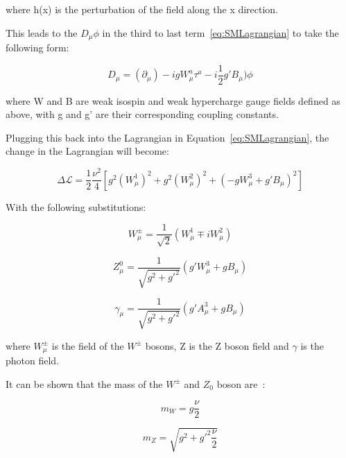 where h(x) is the perturbation of the field along the x direction.

This leads to the $D_{\mu} \phi$ in the third to last term~\ref{eq:SMLagrangian} to take the following form:

\begin{equation}
    D_{\mu} = (\partial_{\mu}) - ig W_{\mu}^{a}\tau^{a} - i\frac{1}{2}g'B_{\mu}) \phi
\end{equation}

where W and B are weak isospin and weak hypercharge gauge fields defined as above, with g and g' are their corresponding coupling constants. %

Plugging this back into the Lagrangian in Equation~\ref{eq:SMLagrangian}, the change in the Lagrangian will become:

\begin{equation}
    \Delta \mathcal{L} = \frac{1}{2} \frac{\nu^{2}}{4}[g^{2}(W^{1}_{\mu})^2 + g^{2}(W_{\mu}^{2})^{2} + (-g W_{\mu}^{3}+ g'B_{\mu})^2]
\end{equation}

With the following substitutions:

\begin{equation}
    W^{\pm}_{\mu} = \frac{1}{\sqrt{2}}(W_{\mu}^{1} \mp iW^{2}_{\mu}) 
\end{equation}

\begin{equation}
    Z^{0}_{\mu}=\frac{1}{\sqrt{g^{2}+g'^{2}}}(g'W_{\mu}^{3} + gB_{\mu})
\end{equation}

\begin{equation}
    \gamma_{\mu} = \frac{1}{\sqrt{g^{2}+g'^{2}}}(g'A^{3}_{\mu} + g B_{\mu})
\end{equation}

where $W^{\pm}_{\mu}$ is the field of the $W^{\pm}$ bosons, Z is the Z boson field and $\gamma$ is the photon field. 

It can be shown that the mass of the $W^{\pm}$ and $Z_{0}$ boson are~\cite{peskin2018introduction}:

\begin{equation}
    m_{W} = g \frac{\nu}{2}
\end{equation}

\begin{equation}
    m_{Z} = \sqrt{g^{2}+ g'^{2}\frac{\nu}{2}}
\end{equation}

